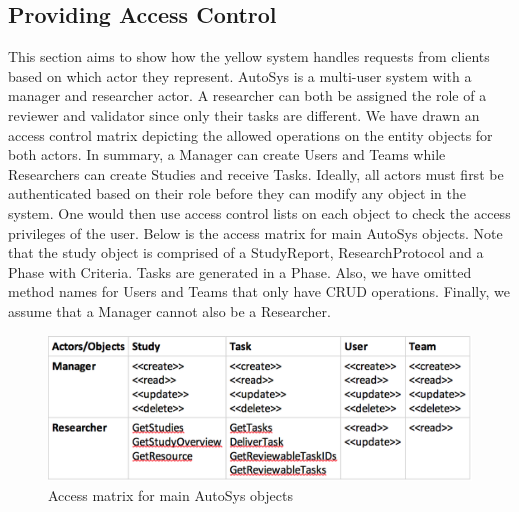 \subsection{Providing Access Control}
This section aims to show how the yellow system handles requests from clients based on which actor they represent. AutoSys is a multi-user system with a manager and researcher actor. A researcher can both be assigned the role of a reviewer and validator since only their tasks are different. We have drawn an access control matrix depicting the allowed operations on the entity objects for both actors. In summary, a Manager can create Users and Teams while Researchers can create Studies and receive Tasks. Ideally, all actors must first be authenticated based on their role before they can modify any object in the system. One would then use access control lists on each object to check the access privileges of the user. 
Below is the access matrix for main AutoSys objects. Note that the study object is comprised of a StudyReport, ResearchProtocol and a Phase with Criteria. Tasks are generated in a Phase. Also, we have omitted method names for Users and Teams that only have CRUD operations. Finally, we assume that a Manager cannot also be a Researcher. 

\begin{figure}[H]
	\includegraphics[width = \linewidth]{Images/accessmatrix}
	\caption{Access matrix for main AutoSys objects}
	\label{fig:accessmatrix}
\end{figure}

